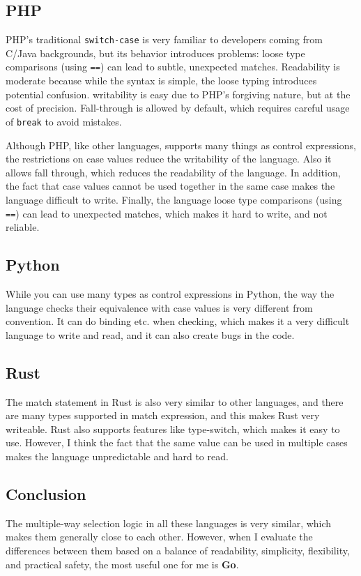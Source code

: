 \documentclass{article}
\begin{document}
\subsection{PHP}
PHP’s traditional \texttt{switch-case} is very familiar to developers coming from C/Java backgrounds, but its behavior introduces problems: loose type comparisons (using \texttt{==}) can lead to subtle, unexpected matches. Readability is moderate because while the syntax is simple, the loose typing introduces potential confusion. writability is easy due to PHP’s forgiving nature, but at the cost of precision. Fall-through is allowed by default, which requires careful usage of \texttt{break} to avoid mistakes.

Although PHP, like other languages, supports many things as control expressions, the restrictions on case values reduce the writability of the language. Also it allows fall through, which reduces the readability of the language. In addition, the fact that case values cannot be used together in the same case makes the language difficult to write. Finally, the language loose type comparisons (using \texttt{==}) can lead to unexpected matches, which makes it hard to write, and not reliable. 

\subsection{Python}
While you can use many types as control expressions in Python, the way the language checks their equivalence with case values is very different from convention. It can do binding etc. when checking, which makes it a very difficult language to write and read, and it can also create bugs in the code.


\subsection{Rust}
The match statement in Rust is also very similar to other languages, and there are many types supported in match expression, and this makes Rust very writeable. Rust also supports features like type-switch, which makes it easy to use. However, I think the fact that the same value can be used in multiple cases makes the language unpredictable and hard to read.


\subsection{Conclusion}
The multiple-way selection logic in all these languages is very similar, which makes them generally close to each other. However, when I evaluate the differences between them based on a balance of readability, simplicity, flexibility, and practical safety, the most useful one for me is \textbf{Go}.
\end{document}

